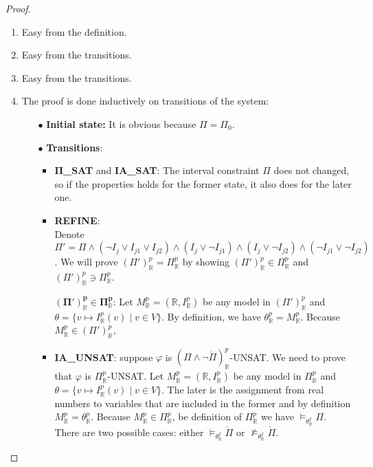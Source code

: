 \begin{proof}   
\begin{enumerate}
\item Easy from the definition.
\item Easy from the transitions.
\item Easy from the transitions.
\item The proof is done inductively on transitions of the system:
\begin{itemize}
\item[$\bullet$] \sloppy \textbf{Initial state:} It is obvious because $\Pi = \Pi_0$.
\item[$\bullet$] \textbf{Transitions}:
\begin{itemize}
\item \textbf{$\pmb\Pi$\_SAT} and \textbf{IA\_SAT}: The interval constraint $\Pi$ does not changed, so if the properties holds for the former state, it also does for the later one.
\item \sloppy \textbf{REFINE}: \\ Denote ${\Pi' = \Pi \wedge (\neg I_j \vee I_{j1} \vee I_{j2}) \wedge (I_j \vee \neg I_{j1}) \wedge (I_j \vee \neg I_{j2}) \wedge (\neg I_{j1} \vee \neg I_{j2})}$. We will prove $(\Pi')^p_\mathbb{R} = \Pi^p_\mathbb{R}$ by showing $(\Pi')^p_\mathbb{R} \in \Pi^p_\mathbb{R}$ and $(\Pi')^p_\mathbb{R} \ni \Pi^p_\mathbb{R}$.

$\pmb{(\Pi')^p_\mathbb{R} \in \Pi^p_\mathbb{R}}$: Let $M^p_\mathbb{R}=(\mathbb{R}, I^p_\mathbb{R})$ be any model in $(\Pi')^p_\mathbb{R}$ and ${\theta = \{v \mapsto I^p_\mathbb{R}(v) \mid v \in V\}}$. By definition, we have $\theta^p_\mathbb{R}=M^p_\mathbb{R}$. Because $M^p_\mathbb{R} \in (\Pi')^p_\mathbb{R}$, 

\item \textbf{IA\_UNSAT}: suppose $\varphi$ is $(\Pi \wedge \neg\mathring{\Pi})^p_\mathbb{R}$-UNSAT. We need to prove that $\varphi$ is $\Pi^p_\mathbb{R}$-UNSAT. Let $M^p_\mathbb{R} = (\mathbb{R}, I^p_\mathbb{R})$ be any model in $\Pi^p_\mathbb{R}$ and ${\theta = \{v \mapsto I^p_\mathbb{R}(v) \mid v \in V\}}$. The later is the assignment from real numbers to variables that are included in the former and by definition $M^p_\mathbb{R} = \theta^p_\mathbb{R}$. Because $M^p_\mathbb{R} \in \Pi^p_\mathbb{R}$, be definition of $\Pi^p_\mathbb{R}$ we have $\models_{\theta^I_\mathbb{R}}\Pi$.
There are two possible cases: either $\models_{\theta^I_\mathbb{R}} \mathring{\Pi}$ or $\not\models_{\theta^I_\mathbb{R}} \mathring{\Pi}$.


\end{itemize}
\end{itemize}
\end{enumerate}
\end{proof}
